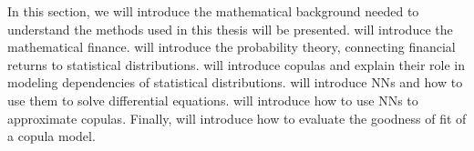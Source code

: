 
In this section, we will introduce the mathematical background needed to understand the methods used in this thesis will be presented.  will introduce the mathematical finance.  will introduce the probability theory, connecting financial returns to statistical distributions.  will introduce copulas and explain their role in modeling dependencies of statistical distributions.  will introduce \gls{NN}s and how to use them to solve differential equations.  will introduce how to use \gls{NN}s to approximate copulas. Finally,  will introduce how to evaluate the goodness of fit of a copula model.

